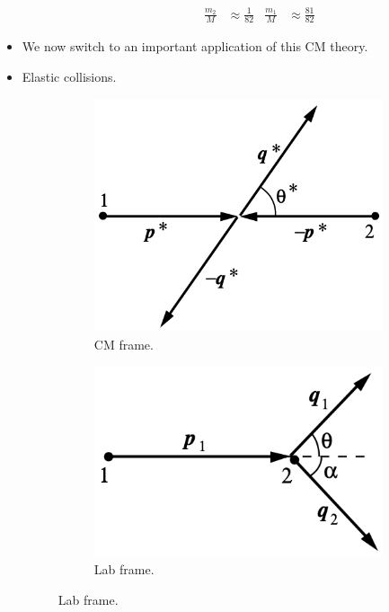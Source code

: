 \documentclass[../notes.tex]{subfiles}
\begin{document}
\begin{itemize}
\begin{itemize}
\begin{itemize}
            \begin{align*}
                \frac{m_2}{M} &\approx \frac{1}{82}&
                \frac{m_1}{M} &\approx \frac{81}{82}
            \end{align*}
        \end{itemize}
    \end{itemize}
    \item We now switch to an important application of this CM theory.
    \item Elastic collisions.
    \begin{figure}[h!]
        \centering
        \begin{subfigure}[b]{0.35\linewidth}
            \centering
            \includegraphics[width=0.8\linewidth]{../ExtFiles/CMelastica.png}
            \caption{CM frame.}
            \label{fig:CMelastica}
        \end{subfigure}
        \begin{subfigure}[b]{0.35\linewidth}
            \centering
            \includegraphics[width=0.7\linewidth]{../ExtFiles/CMelasticb.png}
            \caption{Lab frame.}
            \label{fig:CMelasticb}

\end{subfigure}
\end{figure}
\end{itemize}
\end{document}

